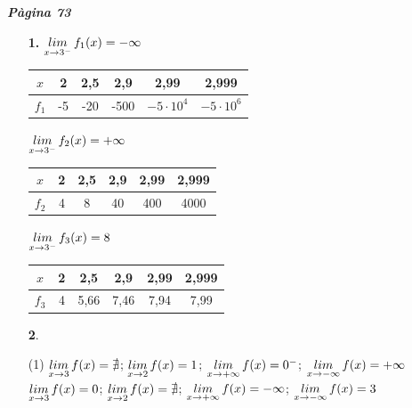 \documentclass[a4paper, pdf, twoside]{book}
\begin{document}
\begin{multicols}{2}
 

\vspace*{0.4cm}
 {}
\vspace{0.3cm}


{\textbf{\em Pàgina 73}} \hrulefill
\begin{enumerate}
\vspace{0.25cm}
\item[\fontfamily{phv}\selectfont\color{blue}\textbf{1. }] 
$\mathop{lim}\limits_{x\to 3^-} f_1(x)=-\infty $\par \begin {tabular}{|c|c|c|c|c|c|} \hline $x$ & 2 & 2,5 & 2,9 & 2,99 & 2,999 \\ \hline $f_1$ & -5 & -20 & -500 & $-5\cdot 10^4$& $-5\cdot 10^6$\\ \hline \end {tabular}\par $\mathop{lim}\limits_{x\to 3^-} f_2(x)=+\infty $\par \begin {tabular}{|c|c|c|c|c|c|} \hline $x$ & 2 & 2,5 & 2,9 & 2,99 & 2,999 \\ \hline $f_2$ & 4 & 8& 40& 400& 4000 \\ \hline \end {tabular}\par $\mathop{lim}\limits_{x\to 3^-} f_3(x)=8$\par \begin {tabular}{|c|c|c|c|c|c|} \hline $x$ & 2 & 2,5 & 2,9 & 2,99 & 2,999 \\ \hline $f_3$ & 4 & 5,66 & 7,46 & 7,94 & 7,99 \\ \hline \end {tabular} 
 \end{enumerate}
\begin{enumerate}
\vspace{0.25cm}



 \item[\fontfamily{phv}\selectfont\color{blue}\textbf{2}. ] 
 \begin{tasks}[column-sep=1em, item-indent=1.3333em](1)
	 \task*  $\mathop{lim}\limits_{x\to 3} f(x)=\nexists $; $\mathop{lim}\limits_{x\to 2} f(x)=1$; $\mathop{lim}\limits_{x\to +\infty } f(x)=0^-$; $\mathop{lim}\limits_{x\to -\infty } f(x)=+\infty $
	 \task* $\mathop{lim}\limits_{x\to 3} f(x)=0$; $\mathop{lim}\limits_{x\to 2} f(x)=\nexists $; $\mathop{lim}\limits_{x\to +\infty } f(x)=-\infty $; $\mathop{lim}\limits_{x\to -\infty } f(x)=3$ 
\end{tasks}
\vspace{0.25cm}



\end{enumerate}
\end{multicols}
\end{document}
